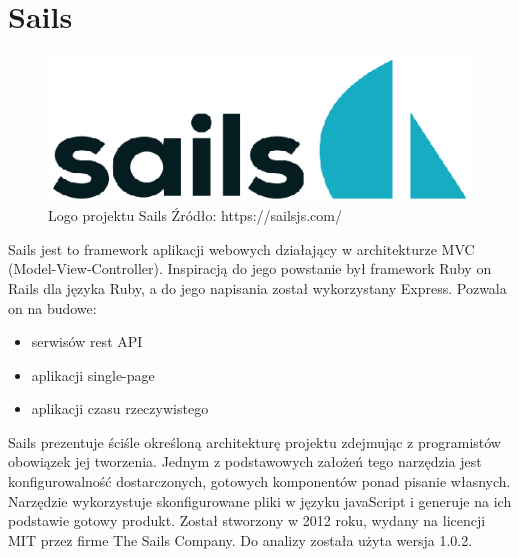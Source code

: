 \documentclass[12pt]{report}
\begin{document}
   \section{Sails}
    \begin{figure}[!hb]
      \centering
      \includegraphics[width=\textwidth,height=\textheight,keepaspectratio]{logo_sails.png} 
      \caption{Logo projektu Sails \newline Źródło: https://sailsjs.com/}
    \end{figure}
    Sails jest to framework aplikacji webowych działający w architekturze MVC (Model-View-Controller).
    Inspiracją do jego powstanie był framework Ruby on Rails dla języka Ruby, a do jego napisania został wykorzystany Express.
    Pozwala on na budowe:
     \begin{itemize}
      \item serwisów rest API
      \item aplikacji single-page 
      \item aplikacji czasu rzeczywistego
    \end{itemize} 
    Sails prezentuje ściśle określoną architekturę projektu zdejmując z programistów obowiązek jej tworzenia.
    Jednym z podstawowych założeń tego narzędzia jest konfigurowalność dostarczonych, gotowych komponentów ponad pisanie własnych.
    Narzędzie wykorzystuje skonfigurowane pliki w języku javaScript i generuje na ich podstawie gotowy produkt.
    Został stworzony w 2012 roku, wydany na licencji MIT przez firme The Sails Company.
    Do analizy została użyta wersja 1.0.2.
\end{document}
